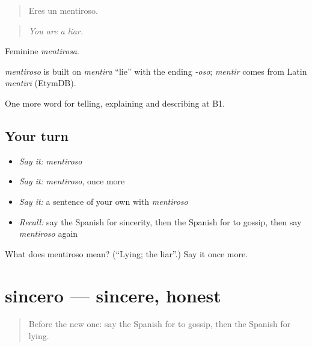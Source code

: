 \begin{quote}
Eres un mentiroso.
\end{quote}

\begin{quote}
\emph{You are a liar.}
\end{quote}

Feminine \emph{mentirosa}.

\begin{cousinweb}
\emph{mentiroso} is built on \emph{mentira} \textquotedblleft{}lie\textquotedblright{} with the ending \emph{-oso}; \emph{mentir} comes from Latin \emph{mentīrī} (EtymDB).
\end{cousinweb}

\begin{grammarlens}[title={What you've built}]
One more word for telling, explaining and describing at B1.
\end{grammarlens}

\subsection*{Your turn}
\begin{itemize}
\raggedright
  \item \emph{Say it:} \emph{mentiroso}
  \item \emph{Say it:} \emph{mentiroso}, once more
  \item \emph{Say it:} a sentence of your own with \emph{mentiroso}
  \item \emph{Recall:} say the Spanish for sincerity, then the Spanish for to gossip, then say \emph{mentiroso} again
\end{itemize}

\begin{tcolorbox}[breakable,colback=teal!4,colframe=teal!35!black,title={Before you move on}]
What does mentiroso mean? (\textquotedblleft{}Lying; the liar\textquotedblright{}.) Say it once more.
\end{tcolorbox}
\section[sincero]{sincero — sincere, honest}

\label{lesson:ES-C724-sincero}



\begin{quote}
Before the new one: say the Spanish for to gossip, then the Spanish for lying.
\end{quote}

